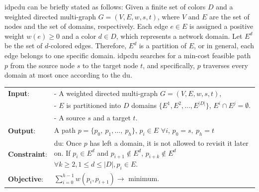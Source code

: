 \gls{idpcdu} can be briefly stated as follows: Given a finite set of colors $D$ and a weighted directed multi-graph $G=(V, E, w, s, t)$, where $V$ and $E$ are the set of nodes and the set of domains, respectively. Each edge $e \in E$ is assigned a positive weight $w(e) \geq 0$ and a color $d \in D$, which represents a network domain. Let $E^d$ be the set of $d$-colored edges. Therefore, $E^d$ is a partition of $E$, or in general, each edge belongs to one specific domain. \gls{idpcdu} searches for a min-cost feasible path $p$ from the source node $s$ to the target node $t$, and specifically, $p$ traverses every domain at most once according to the \gls{du}.

\begin{center}
	\begin{tabular}{lp{10cm}}
		\hline 
		\textbf{Input}:	&- A weighted directed multi-graph 
		$G = (V, E, w, s, t)$,\\
		&- $E$ is partitioned into $D$ domains $\{E^1, E^2, . . ., E^{|D|}\}$, $E^i \cap E^j = \emptyset$.\\
		&  - A source $s$ and a target $t$.\\
		\hline
		\textbf{Output}: &  A path $p = \{p_0,~p_1,\dots,~p_h\}$, $p_i \in E$ $\forall i$, $p_0 = s,~p_h = t$\\
		\hline 
		\textbf{Constraint}: & \gls{du}: Once $p$ has left a domain, it is not allowed to revisit it later on. If $p_{i} \in E^d$ and $p_{i+1} \notin E^d$, $p_{i+k} \notin E^d$  $\forall k\geq2, 1\le d \le |D|, p_i \in E$. \\
		\hline 
		\textbf{Objective}: & $\displaystyle \sum_{i =0 }^{h-1} w(p_i,p_{i+1}) \rightarrow $ minimum.\\
		\hline 
	\end{tabular}
\end{center}

